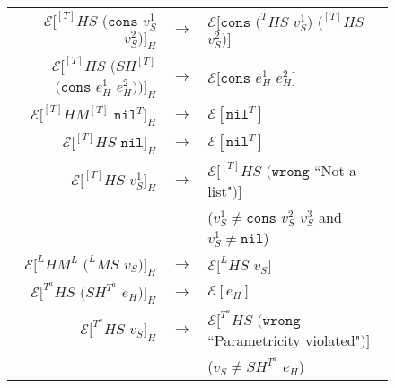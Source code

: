 \begin{figure}[p]
\begin{center}
\begin{tabular}{rcl}
$\mathscr{E}[^{[T]}HS$ $(\mathtt{cons}$ $v_{S}^{1}$ $v_{S}^{2})]_{H}$ & $\rightarrow$ & $\mathscr{E}[\mathtt{cons}$ $(^{T}HS$ $v_{S}^{1})$ $(^{[T]}HS$ $v_{S}^{2})]$ \\
$\mathscr{E}[^{[T]}HS$ $(SH^{[T]}$ $(\mathtt{cons}$ $e_{H}^{1}$ $e_{H}^{2}))]_{H}$ & $\rightarrow$ & $\mathscr{E}[\mathtt{cons}$ $e_{H}^{1}$ $e_{H}^{2}]$ \\
$\mathscr{E}[^{[T]}HM^{[T]}$ $\mathtt{nil}^{T}]_{H}$ & $\rightarrow$ & $\mathscr{E}[\mathtt{nil}^{T}]$ \\
$\mathscr{E}[^{[T]}HS$ $\mathtt{nil}]_{H}$ & $\rightarrow$ & $\mathscr{E}[\mathtt{nil}^{T}]$ \\
$\mathscr{E}[^{[T]}HS$ $v_{S}^{1}]_{H}$ & $\rightarrow$ & $\mathscr{E}[^{[T]}HS$ $(\mathtt{wrong}$ ``Not a list"$)]$ \\
&& ($v_{S}^{1}\neq\mathtt{cons}$ $v_{S}^{2}$ $v_{S}^{3}$ and $v_{S}^{1}\neq\mathtt{nil}$) \\
$\mathscr{E}[^{L}HM^{L}$ $(^{L}MS$ $v_{S})]_{H}$ & $\rightarrow$ & $\mathscr{E}[^{L}HS$ $v_{S}]$ \\
$\mathscr{E}[^{T^{a}}HS$ $(SH^{T^{a}}$ $e_{H})]_{H}$ & $\rightarrow$ & $\mathscr{E}[e_{H}]$ \\
$\mathscr{E}[^{T^{a}}HS$ $v_{S}]_{H}$ & $\rightarrow$ & $\mathscr{E}[^{T^{a}}HS$ $(\mathtt{wrong}$ ``Parametricity violated"$)]$ \\
&& ($v_{S}\neq SH^{T^{a}}$ $e_{H}$)
\end{tabular}
\end{center}
\end{figure}